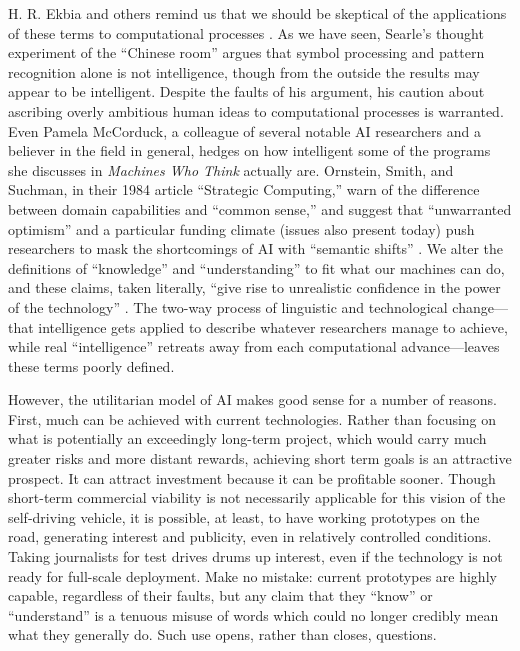 H. R. Ekbia and others remind us that we should be skeptical of the
applications of these terms to computational processes \cite{ekbia}. As we have
seen, Searle's thought experiment of the ``Chinese room''
argues that symbol processing and pattern recognition alone is not
intelligence, though from the outside the results may appear to be
intelligent. Despite the faults of his argument, his caution
about ascribing overly ambitious human ideas to computational
processes is warranted. Even Pamela McCorduck, a colleague of several
notable AI researchers and a believer in the field in general, hedges
on how intelligent some of the programs she discusses in \emph{Machines Who
Think} actually are. Ornstein, Smith, and Suchman, in their 1984
article ``Strategic Computing,'' warn of the difference between domain
capabilities and ``common sense,'' and suggest that ``unwarranted
optimism'' and a particular funding climate (issues also present today)
push researchers to mask the shortcomings of AI with ``semantic
shifts'' \cite[p. 14]{ornstein}. We alter the definitions of ``knowledge'' and ``understanding''
to fit what our machines can do, and these claims, taken literally,
``give rise to unrealistic confidence in the power of the
technology'' \cite[p. 15]{ornstein}.
The two-way process of linguistic and technological change---that
intelligence gets applied to describe whatever researchers manage to
achieve, while real ``intelligence'' retreats away from each
computational advance---leaves these terms poorly defined.

However, the utilitarian model of AI makes good sense for a number of reasons.
First, much can be achieved with current technologies. Rather than
focusing on what is potentially an exceedingly long-term project,
which would carry much greater risks and more distant rewards,
achieving short term goals is an 
attractive prospect. It can attract investment because it can be
profitable sooner. Though short-term commercial viability is not
necessarily applicable for this vision of the self-driving vehicle, it
is possible, at least, to have working prototypes on the road, generating
interest and publicity, even in relatively controlled conditions. Taking
journalists for test drives drums up interest, even if the technology
is not ready for full-scale deployment. Make no mistake: current
prototypes are highly capable, regardless of their faults, but any claim that
they ``know'' or ``understand'' is a tenuous misuse of words which
could no longer credibly mean what they generally do. Such use opens,
rather than closes, questions.

